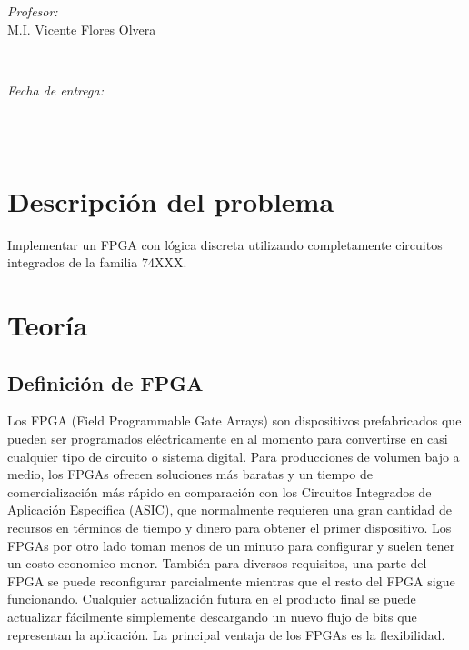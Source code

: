 \documentclass[12pt]{article}
\makeatletter
\let\thedate\@date
\makeatother
\begin{document}
\begin{titlepage}
    \begin{minipage}{0.4\textwidth}
        \begin{flushleft} \large
            \emph{Profesor:}\\
            M.I. Vicente Flores Olvera
        \end{flushleft}
    \end{minipage}~
    \begin{minipage}{0.4\textwidth}
        \begin{flushright} \large
            \emph{Fecha de entrega:}\\
            {\large \thedate}\\[2 cm]
        \end{flushright}
    \end{minipage}\\[2 cm]
    
    
 
    \vfill
    
\end{titlepage}


\tableofcontents
\pagebreak


\section{Descripción del problema}

Implementar un FPGA con lógica  discreta utilizando completamente circuitos integrados de la familia 74XXX.

\section{Teoría}

\subsection{Definición de FPGA}
\cite{ref:web1} Los FPGA (Field Programmable Gate Arrays) son dispositivos prefabricados que pueden ser programados eléctricamente en al momento para convertirse en casi cualquier tipo de circuito o sistema digital. Para producciones de volumen bajo a medio, los FPGAs ofrecen soluciones más baratas y un tiempo de comercialización más rápido en comparación con los Circuitos Integrados de Aplicación Específica (ASIC), que normalmente requieren una gran cantidad de recursos en términos de tiempo y dinero para obtener el primer dispositivo. Los FPGAs por otro lado toman menos de un minuto para configurar y suelen tener un costo economico menor. También para diversos requisitos, una parte del FPGA se puede reconfigurar parcialmente mientras que el resto del FPGA sigue funcionando. Cualquier actualización futura en el producto final se puede actualizar fácilmente simplemente descargando un nuevo flujo de bits que representan la aplicación. La principal ventaja de los FPGAs es la flexibilidad.
\end{document}

